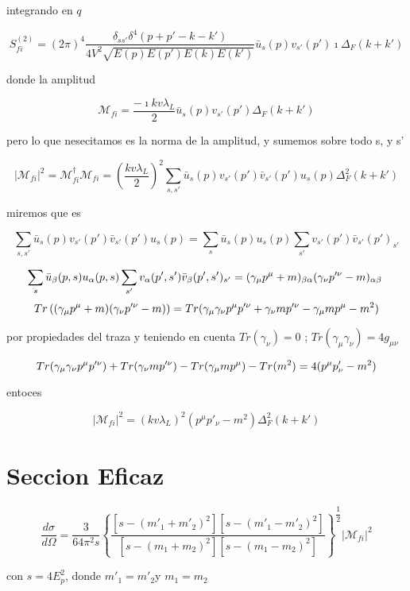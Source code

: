integrando en $q$

\[
S_{fi}^{(2)}=(2\pi)^{4}\dfrac{\delta_{ss'}\delta^{4}(p+p'-k-k')}{4V^{2}\sqrt{E(p)E(p')E(k)E(k')}}\bar{u}_{s}(p)v_{s'}(p')\imath\Delta_{F}(k+k')\]


donde la amplitud

\[
\mathcal{M}_{fi}=\dfrac{-\imath kv\lambda_{L}}{2}\bar{u}_{s}(p)v_{s'}(p')\Delta_{F}(k+k')\]


pero lo que nesecitamos es la norma de la amplitud, y sumemos sobre
todo s, y s'

\[
\vert\mathcal{M}_{fi}\vert^{2}=\mathcal{M}_{fi}^{\dagger}\mathcal{M}_{fi}=\left(\dfrac{kv\lambda_{L}}{2}\right)^{2}\sum_{s,s'}\bar{u}_{s}(p)v_{s'}(p')\bar{v}_{s'}(p')u_{s}(p)\Delta_{F}^{2}(k+k')\]


miremos que es 

\[
\sum_{s,s'}\bar{u}_{s}(p)v_{s'}(p')\bar{v}_{s'}(p')u_{s}(p)=\sum_{s}\bar{u}_{s}(p)u_{s}(p)\sum_{s'}v_{s'}(p')\bar{v}_{s'}(p')_{s'}\]


\[
\sum_{s}\bar{u}_{\beta}(p,s)u_{\alpha}(p,s)\sum_{s'}v_{\alpha}(p',s')\bar{v}_{\beta}(p',s')_{s'}=(\gamma_{\mu}p^{\mu}+m)_{\beta\alpha}(\gamma_{\nu}p'^{\nu}-m)_{\text{\ensuremath{\alpha\beta}\ }}\]
\[
Tr\left((\gamma_{\mu}p^{\mu}+m)(\gamma_{\nu}p'^{\nu}-m)\right)=Tr(\gamma_{\mu}\gamma_{\nu}p^{\mu}p'^{\nu}+\gamma_{\nu}mp'^{\nu}-\gamma_{\mu}mp^{\text{\ensuremath{\mu}}}-m^{2})\]


por propiedades del traza y teniendo en cuenta $Tr(\gamma_{\nu})=0$
; $Tr(\gamma_{\mu}\gamma_{\nu})=4g_{\mu\nu}$

\[
Tr(\gamma_{\mu}\gamma_{\nu}p^{\mu}p'^{\nu})+Tr(\gamma_{\nu}mp'^{\nu})-Tr(\gamma_{\mu}mp^{\text{\ensuremath{\mu}}})-Tr(m^{2})=4(p^{\mu}p'_{\nu}-m^{2})\]


entoces

\[
\vert\mathcal{M}_{fi}\vert^{2}=\left(kv\lambda_{L}\right)^{2}(p^{\mu}p'_{\nu}-m^{2})\Delta_{F}^{2}(k+k')\]



\section*{Seccion Eficaz}

\[
\dfrac{d\sigma}{d\Omega}=\dfrac{3}{64\pi^{2}s}\left\{ \dfrac{\left[s-(m'_{1}+m'_{2})^{2}\right]\left[s-(m'_{1}-m'_{2})^{2}\right]}{\left[s-(m_{1}+m_{2})^{2}\right]\left[s-(m_{1}-m_{2})^{2}\right]}\right\} ^{\dfrac{1}{2}}\vert\mathcal{M}_{fi}\vert^{2}\]


con $s=4E_{p}^{2}$, donde $m'_{1}=m'_{2}$y $m_{1}=m_{2}$

